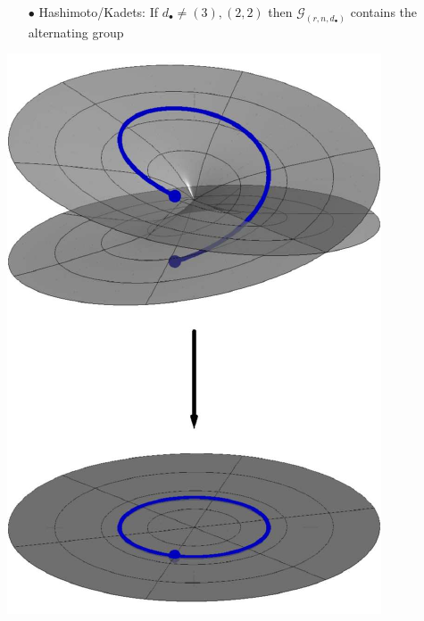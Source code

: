 \documentclass{beamer}
\theoremstyle{definition}
\begin{document}
\begin{frame}
\begin{minipage}{.73\textwidth}
\begin{enumerate}
\item[$\bullet$] Hashimoto/Kadets: If $d_\bullet\ne(3),(2,2)$ then $\mathcal{G}_{(r,n,d_\bullet)}$ contains the alternating group
\end{enumerate}
\end{minipage}
%
\begin{minipage}{.25\textwidth}
\begin{center}
\includegraphics[scale=.5]{figures/monodromy.pdf}
\end{center}
\end{minipage}

\end{frame}




\end{document}

